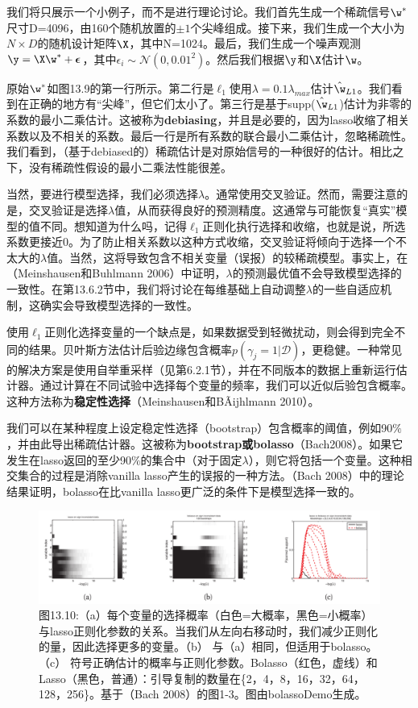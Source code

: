\documentclass[a4paper]{article}
\begin{document}
我们将只展示一个小例子，而不是进行理论讨论。我们首先生成一个稀疏信号$\w^*$尺寸D=4096，由160个随机放置的$\pm 1$个尖峰组成。接下来，我们生成一个大小为$N\times D$的随机设计矩阵$\X$，其中N=1024。最后，我们生成一个噪声观测$\y=\X\w^*+\boldsymbol{\epsilon}$，其中$\epsilon_i\sim \mathcal{N}(0,0.01^2)$。然后我们根据$\y$和$\X$估计$\w$。

原始$\w^*$如图13.9的第一行所示。第二行是$\ell_1$使用$\lambda=0.1\lambda_{max}$估计$\hat{\w}_{L1}$。我们看到在正确的地方有“尖峰”，但它们太小了。第三行是基于supp($\hat{\w}_{L1}$)估计为非零的系数的最小二乘估计。这被称为\textbf{debiasing}，并且是必要的，因为lasso收缩了相关系数以及不相关的系数。最后一行是所有系数的联合最小二乘估计，忽略稀疏性。我们看到，（基于debiased的）稀疏估计是对原始信号的一种很好的估计。相比之下，没有稀疏性假设的最小二乘法性能很差。

当然，要进行模型选择，我们必须选择$\lambda$。通常使用交叉验证。然而，需要注意的是，交叉验证是选择$\lambda$值，从而获得良好的预测精度。这通常与可能恢复“真实”模型的值不同。想知道为什么吗，记得$\ell_1$正则化执行选择和收缩，也就是说，所选系数更接近0。为了防止相关系数以这种方式收缩，交叉验证将倾向于选择一个不太大的$\lambda$值。当然，这将导致包含不相关变量（误报）的较稀疏模型。事实上，在（Meinshausen和Buhlmann 2006）中证明，$\lambda$的预测最优值不会导致模型选择的一致性。在第13.6.2节中，我们将讨论在每维基础上自动调整$\lambda$的一些自适应机制，这确实会导致模型选择的一致性。

使用$\ell_1$正则化选择变量的一个缺点是，如果数据受到轻微扰动，则会得到完全不同的结果。贝叶斯方法估计后验边缘包含概率$p(\gamma_j=1|\mathcal{D})$，更稳健。一种常见的解决方案是使用自举重采样（见第6.2.1节），并在不同版本的数据上重新运行估计器。通过计算在不同试验中选择每个变量的频率，我们可以近似后验包含概率。这种方法称为\textbf{稳定性选择}（Meinshausen和BÃijhlmann 2010）。

我们可以在某种程度上设定稳定性选择（bootstrap）包含概率的阈值，例如90$\%$，并由此导出稀疏估计器。这被称为\textbf{bootstrap或bolasso}（Bach2008）。如果它发生在lasso返回的至少90$\%$的集合中（对于固定$\lambda$），则它将包括一个变量。这种相交集合的过程是消除vanilla lasso产生的误报的一种方法。（Bach 2008）中的理论结果证明，bolasso在比vanilla lasso更广泛的条件下是模型选择一致的。

\begin{figure}[h]
	\centering
	\includegraphics[width=0.7\linewidth]{fig13/figure10}
	\caption*{图13.10:（a）每个变量的选择概率（白色=大概率，黑色=小概率）与lasso正则化参数的关系。当我们从左向右移动时，我们减少正则化的量，因此选择更多的变量。（b） 与（a）相同，但适用于bolasso。（c） 符号正确估计的概率与正则化参数。Bolasso（红色，虚线）和Lasso（黑色，普通）：引导复制的数量在\{2，4，8，16，32，64，128，256\}。基于（Bach 2008）的图1-3。图由bolassoDemo生成。}
\end{figure}
\end{document}
